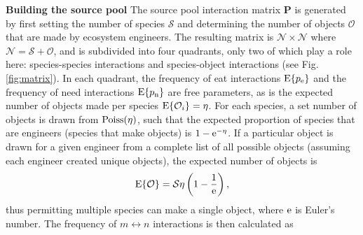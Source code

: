 \documentclass[twocolumn,preprintnumbers,amsmath,amssymb,superscriptaddress]{revtex4}
\newcommand{\rr}[1]{{\rm #1}}
\begin{document}
\textbf{Building the source pool} The source pool interaction matrix $\bm P$ is generated by first setting the number of species $\mathcal{S}$ and determining the number of objects $\mathcal{O}$ that are made by ecosystem engineers.
The resulting matrix is $\mathcal{N}\times\mathcal{N}$ where $\mathcal{N}=\mathcal{S}+\mathcal{O}$, and is subdivided into four quadrants, only two of which play a role here: species-species interactions and species-object interactions (see Fig. \ref{fig:matrix}).
In each quadrant, the frequency of eat interactions ${\rm E}\{p_\rr{e}\}$ and the frequency of need interactions ${\rm E}\{p_\rr{n}\}$ are free parameters, as is the expected number of objects made per species ${\rm E}\{\mathcal{O}_i\}=\eta$.
For each species, a set number of objects is drawn from ${\rm Poiss}(\eta)$, such that the expected proportion of species that are engineers (species that make objects) is $1-{\rm e}^{-\eta}$. 
If a particular object is drawn for a given engineer from a complete list of all possible objects (assuming each engineer created unique objects), the expected number of objects is
\begin{equation}
{\rm E}\{\mathcal{O}\} = \mathcal{S}\eta\left(1 - \frac{1}{{\rm e}}\right),
\end{equation}
thus permitting multiple species can make a single object, where $\rm e$ is Euler's number.
The frequency of $m \leftrightarrow n$ interactions is then calculated as
\end{document}
